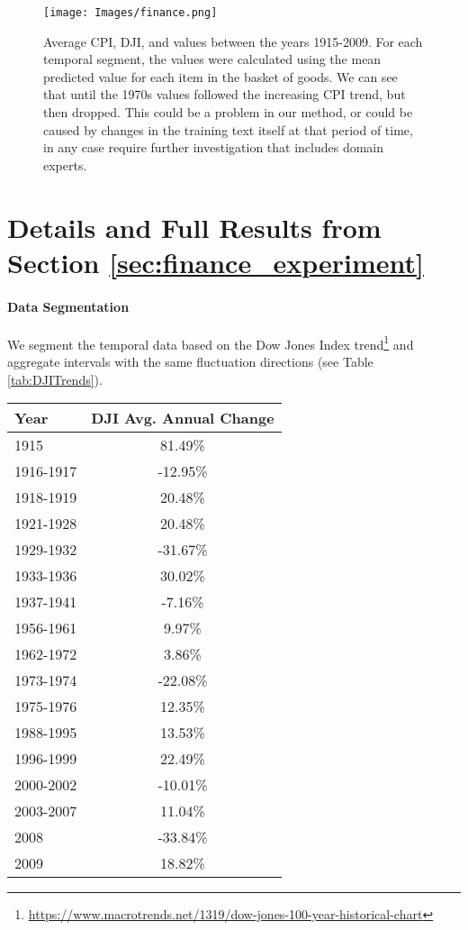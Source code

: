 \begin{figure}[h!]
    \texttt{[image: Images/finance.png]}
    \caption{Average CPI, DJI, and \wc values between the years 1915-2009. 
    For each temporal segment, the \wc values were calculated using the mean predicted value for each item in the basket of goods. We can see that until the 1970s \wc values followed the increasing CPI trend, but then dropped.  This could be a problem in our method, or could be caused by changes in the training text itself at that period of time, in any case  require further investigation that includes domain experts.}
    \label{fig:finance}
\end{figure}


\section{Details and Full Results from Section \ref{sec:finance_experiment}}
\label{appendix:financial_report}
\paragraph{Data Segmentation}
We segment the temporal data based on the Dow Jones Index  trend\footnote{\url{https://www.macrotrends.net/1319/dow-jones-100-year-historical-chart}} and aggregate intervals with the same fluctuation directions (see Table \ref{tab:DJITrends}).
\begin{table*}[h!]
    \centering
    \begin{tabular}{lc} \toprule
    \textbf{Year} & \textbf{DJI Avg. Annual Change} \\ \midrule
      1915 & 81.49\% \\ 
 1916-1917 & -12.95\%  \\
 1918-1919 & 20.48\%  \\
 1921-1928 & 20.48\% \\
 1929-1932 & -31.67\%  \\
 1933-1936 & 30.02\%  \\ 
 1937-1941 & -7.16\%  \\ 
 1956-1961 & 9.97\%  \\ 
 1962-1972 & 3.86\%  \\ 
 1973-1974 & -22.08\%  \\
 1975-1976 & 12.35\%  \\
 1988-1995 & 13.53\%  \\
 1996-1999 & 22.49\%  \\
 2000-2002 & -10.01\%  \\
 2003-2007 & 11.04\% \\
 2008 & -33.84\% \\
 2009 & 18.82\%  \\ 
 \bottomrule
    \end{tabular}
    \caption{Years aggregated by DJI fluctuation directions}
    \label{tab:DJITrends}
\end{table*}

